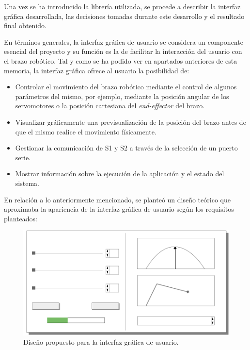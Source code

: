 Una vez se ha introducido la librería utilizada, se procede a describir la interfaz gráfica desarrollada, las decisiones tomadas durante este desarrollo y el resultado final obtenido.

En términos generales, la interfaz gráfica de usuario se considera un componente esencial del proyecto y su función es la de facilitar la interacción del usuario con el brazo robótico. Tal y como se ha podido ver en apartados anteriores de esta memoria, la interfaz gráfica ofrece al usuario la posibilidad de:
\begin{itemize}
    \item Controlar el movimiento del brazo robótico mediante el control de algunos parámetros del mismo, por ejemplo, mediante la posición angular de los servomotores o la posición cartesiana del \textit{end-effector} del brazo.
    \item Visualizar gráficamente una previsualización de la posición del brazo antes de que el mismo realice el movimiento físicamente.
    \item Gestionar la comunicación de \ac{S1} y \ac{S2} a través de la selección de un puerto serie.
    \item Mostrar información sobre la ejecución de la aplicación y el estado del sistema.
\end{itemize}

En relación a lo anteriormente mencionado, se planteó un diseño teórico que aproximaba la apariencia de la interfaz gráfica de usuario según los requisitos planteados:

\begin{figure}[H]
    \centering
    \includegraphics[width=0.6\linewidth]{RS/images/InterfaceSketch-MkII.png}
    \caption{Diseño propuesto para la interfaz gráfica de usuario.}
    \label{fig:ui_design}
\end{figure}


